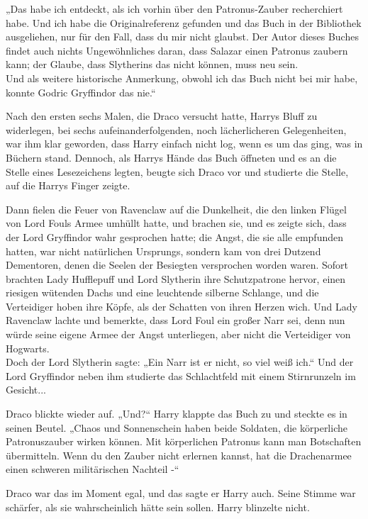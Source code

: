{„Das habe ich entdeckt, als ich vorhin über den Patronus-Zauber recherchiert habe. Und ich habe die Originalreferenz gefunden und das Buch in der Bibliothek ausgeliehen, nur für den Fall, dass du mir nicht glaubst. Der Autor dieses Buches findet auch nichts Ungewöhnliches daran, dass Salazar einen Patronus zaubern kann; der Glaube, dass Slytherins das nicht können, muss neu sein.\\ Und als weitere historische Anmerkung, obwohl ich das Buch nicht bei mir habe, konnte Godric Gryffindor das nie.“

Nach den ersten sechs Malen, die Draco versucht hatte, Harrys Bluff zu widerlegen, bei sechs aufeinanderfolgenden, noch lächerlicheren Gelegenheiten, war ihm klar geworden, dass Harry einfach nicht log, wenn es um das ging, was in Büchern stand. Dennoch, als Harrys Hände das Buch öffneten und es an die Stelle eines Lesezeichens legten, beugte sich Draco vor und studierte die Stelle, auf die Harrys Finger zeigte.

Dann fielen die Feuer von Ravenclaw auf die Dunkelheit, die den linken Flügel von Lord Fouls Armee umhüllt hatte, und brachen sie, und es zeigte sich, dass der Lord Gryffindor wahr gesprochen hatte; die Angst, die sie alle empfunden hatten, war nicht natürlichen Ursprungs, sondern kam von drei Dutzend Dementoren, denen die Seelen der Besiegten versprochen worden waren. Sofort brachten Lady Hufflepuff und Lord Slytherin ihre Schutzpatrone hervor, einen riesigen wütenden Dachs und eine leuchtende silberne Schlange, und die Verteidiger hoben ihre Köpfe, als der Schatten von ihren Herzen wich. Und Lady Ravenclaw lachte und bemerkte, dass Lord Foul ein großer Narr sei, denn nun würde seine eigene Armee der Angst unterliegen, aber nicht die Verteidiger von Hogwarts.\\ Doch der Lord Slytherin sagte: „Ein Narr ist er nicht, so viel weiß ich.“ Und der Lord Gryffindor neben ihm studierte das Schlachtfeld mit einem Stirnrunzeln im Gesicht...

Draco blickte wieder auf. „Und?“ Harry klappte das Buch zu und steckte es in seinen Beutel. „Chaos und Sonnenschein haben beide Soldaten, die körperliche Patronuszauber wirken können. Mit körperlichen Patronus kann man Botschaften übermitteln. Wenn du den Zauber nicht erlernen kannst, hat die Drachenarmee einen schweren militärischen Nachteil -“

Draco war das im Moment egal, und das sagte er Harry auch. Seine Stimme war schärfer, als sie wahrscheinlich hätte sein sollen. Harry blinzelte nicht.

}
